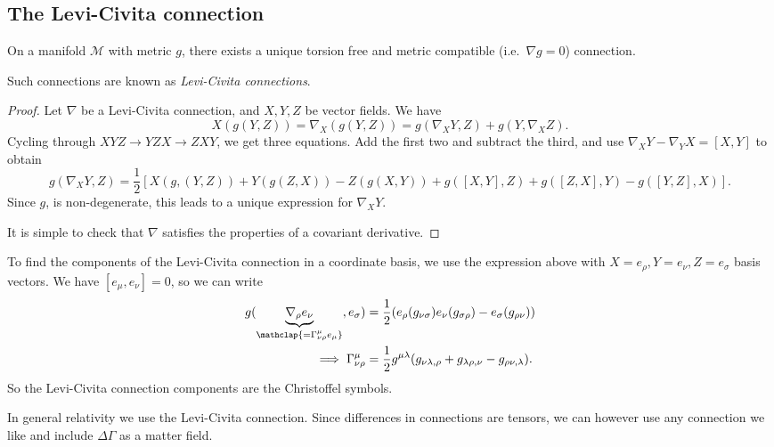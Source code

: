 \documentclass{jknotes}
\begin{document}
\subsection{The Levi-Civita connection}
\begin{theorem}
    On a manifold \(\mathcal{M}\) with metric \(g\), there exists a unique torsion free and metric compatible (i.e.\ \(\nabla g = 0\)) connection.
\end{theorem}
Such connections are known as \emph{Levi-Civita connections}.
\begin{proof}
    Let \(\nabla\) be a Levi-Civita connection, and \(X,Y,Z\) be vector fields. We have
    \begin{equation}
        X(g(Y,Z)) = \nabla_X(g(Y,Z)) = g(\nabla_XY,Z) + g(Y,\nabla_XZ).
    \end{equation}
    Cycling through \(XYZ\to YZX\to ZXY\), we get three equations. Add the first two and subtract the third, and use \(\nabla_XY-\nabla_YX=[X,Y]\) to obtain
    \begin{equation}
        g(\nabla_XY,Z) = \frac12[X(g,(Y,Z)) + Y(g(Z,X)) - Z(g(X,Y)) + g([X,Y],Z) + g([Z,X],Y) - g([Y,Z],X)].
    \end{equation}
    Since \(g\), is non-degenerate, this leads to a unique expression for \(\nabla_XY\). 

    It is simple to check that \(\nabla\) satisfies the properties of a covariant derivative.
\end{proof}

To find the components of the Levi-Civita connection in a coordinate basis, we use the expression above with \(X=e_\rho,Y=e_\nu,Z=e_\sigma\) basis vectors. We have \([e_\mu,e_\nu]=0\), so we can write
\begin{align}
    g(\underbrace{\nabla_\rho e_\nu}_{\mathclap{=\Gamma^\mu_{\nu\rho}e_\mu}},e_\sigma) &= \frac12 (e_\rho(g_{\nu\sigma}) e_\nu(g_{\sigma\rho}) - e_\sigma(g_{\rho\nu})) \\
    \implies \Gamma^\mu_{\nu\rho} &= \frac12g^{\mu\lambda}(g_{\nu\lambda,\rho}+g_{\lambda\rho,\nu} - g_{\rho\nu,\lambda}).
\end{align}
So the Levi-Civita connection components are the Christoffel symbols.

In general relativity we use the Levi-Civita connection. Since differences in connections are tensors, we can however use any connection we like and include \(\Delta\Gamma\) as a matter field.
\end{document}
